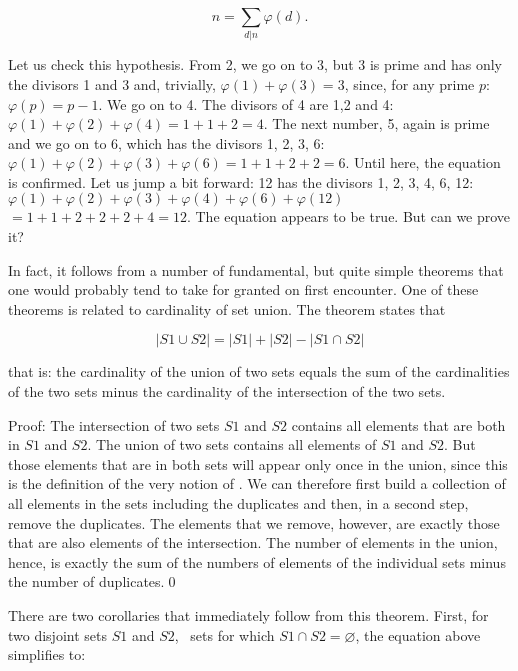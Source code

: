 \documentclass[tikz]{scrreprt}
\begin{document}
\begin{equation}
n = \sum_{d|n}{\varphi(d)}.
\end{equation}

Let us check this hypothesis.
From 2, we go on to 3, but 3 is prime
and has only the divisors 1 and 3
and, trivially, $\varphi(1) + \varphi(3) = 3$,
since, for any prime $p$: $\varphi(p) = p-1$.
We go on to 4.
The divisors of 4 are 1,2 and 4:
$\varphi(1) + \varphi(2) + \varphi(4) = 1 + 1 + 2 = 4$.
The next number, 5, again is prime
and we go on to 6, which has the divisors
1, 2, 3, 6:
$\varphi(1) + \varphi(2) + \varphi(3) + \varphi(6) = 1 + 1 + 2 + 2 = 6$.
Until here, the equation is confirmed. 
Let us jump a bit forward: 
12 has the divisors 1, 2, 3, 4, 6, 12:
$\varphi(1) + \varphi(2) + \varphi(3) + \varphi(4) + \varphi(6) + \varphi(12)$
$ = 1 + 1 + 2 + 2 + 2 + 4 = 12$.
The equation appears to be true.
But can we prove it?

In fact, it follows from a number of fundamental,
but quite simple theorems that one would probably
tend to take for granted on first encounter.
One of these theorems is related to cardinality of
set union. The theorem states that

\begin{equation}
|S1 \cup S2| = |S1| + |S2| - |S1 \cap S2|
\end{equation}

that is: the cardinality of the union of two sets
equals the sum of the cardinalities of the two sets
minus the cardinality of the intersection of the two sets.

Proof: The intersection of two sets $S1$ and $S2$
contains all elements that are both in $S1$ and $S2$.
The union of two sets contains all elements of $S1$ and
$S2$. But those elements that are in both sets
will appear only once in the union, since this is
the definition of the very notion of .
We can therefore first build a collection of
all elements in the sets including the duplicates
and then, in a second step, remove the duplicates.
The elements that we remove, however, 
are exactly those 
that are also elements of the intersection.
The number of elements in the union, hence,
is exactly the sum of the numbers of elements
of the individual sets minus the number of duplicates.\qed

There are two corollaries that immediately follow
from this theorem.
First, for two disjoint sets $S1$ and $S2$, 
\ie\ sets for which $S1 \cap S2 = \varnothing$,
the equation above simplifies to:
\end{document}
